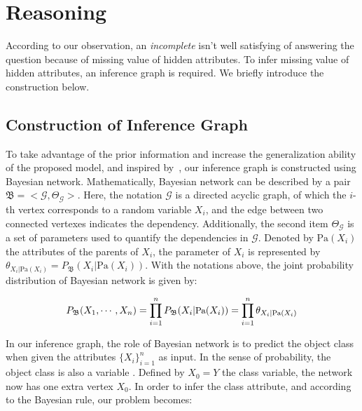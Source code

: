 \section{Reasoning}
\label{sec-reasoning}

According to our observation,  an {\em incomplete}  isn't well satisfying of answering the question because of missing value of hidden attributes.
To infer missing value of hidden attributes, 
an inference graph is required.  
We briefly introduce the construction below. 

\subsection{Construction of Inference Graph}
To take advantage of the prior information and increase the generalization ability of the proposed model, and inspired by~\cite{peixi2019}, our inference graph is constructed using Bayesian network.
Mathematically, Bayesian network \cite{friedman1997bayesian} can be described by a pair $\mathfrak{B}=<\mathcal{G},\varTheta_\mathcal{G}>$. 
Here, the notation $\mathcal{G}$ is a directed acyclic graph, of which the $i$-th vertex corresponds to a random variable $X_i$, and the edge between two connected vertexes indicates the dependency. 
Additionally, the second item $\varTheta_\mathcal{G}$ is a set of parameters used to quantify the dependencies in $\mathcal{G}$.
Denoted by $\text{Pa}(X_i)$ the attributes of the parents of $X_i$, 
the parameter of $X_i$ is represented by  $\theta_{X_i | \text{Pa}(X_i)} = P_\mathfrak{B}(X_i| \text{Pa}{(X_i)})$.
With the notations above, the joint probability distribution of Bayesian network is given by: 

\begin{equation}\label{eq:BNOri}
\small
P_\mathfrak{B}(X_1, \cdots, X_n) = 
\prod_{i=1}^{n} P_\mathfrak{B}(X_i| \text{Pa}{(X_i)})=
\prod_{i=1}^{n} \theta_{X_i | \text{Pa}(X_i)}
\end{equation}
\vspace{-1ex}

In our inference graph, the role of Bayesian network is to predict the object class when given the attributes $\{X_i\}_{i=1}^n$ as input. In the sense of probability, the object class is also a variable \cite{koller2009probabilistic}.
Defined by $X_0=Y$ the class variable, the network now has one extra vertex $X_0$.
In order to infer the class attribute, and according to the Bayesian rule, our problem becomes:

